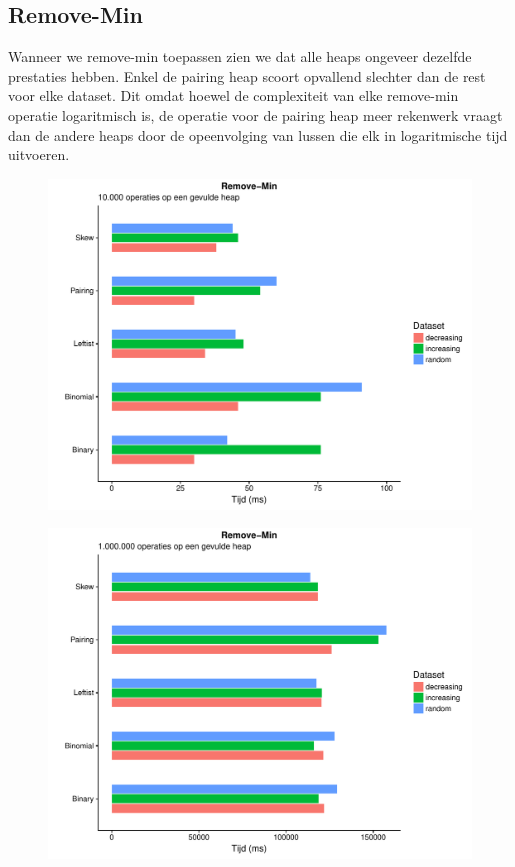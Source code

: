 \documentclass[a4paper,12pt]{report}
\begin{document}
\subsection{Remove-Min}
Wanneer we remove-min toepassen zien we dat alle heaps ongeveer dezelfde prestaties hebben. Enkel de pairing heap scoort opvallend slechter dan de rest voor elke dataset. Dit omdat hoewel de complexiteit van elke remove-min operatie logaritmisch is, de operatie voor de pairing heap meer rekenwerk vraagt dan de andere heaps door de opeenvolging van lussen die elk in logaritmische tijd uitvoeren.
\begin{figure}[H]
	\includegraphics[scale=0.9]{grafieken/remove_min_10k}
\end{figure}
\begin{figure}[H]
	\includegraphics[scale=0.9]{grafieken/remove_min_1mil}
\end{figure}
\end{document}
